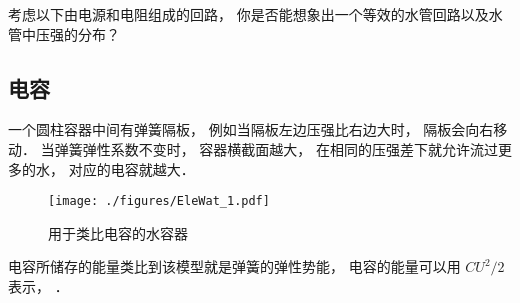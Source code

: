 \begin{exercise}{}
考虑以下由电源和电阻组成的回路， 你是否能想象出一个等效的水管回路以及水管中压强的分布？
\end{exercise}

\subsection{电容}
一个圆柱容器中间有弹簧隔板， 例如当隔板左边压强比右边大时， 隔板会向右移动． 当弹簧弹性系数不变时， 容器横截面越大， 在相同的压强差下就允许流过更多的水， 对应的电容就越大．
\begin{figure}[ht]
\centering
\texttt{[image: ./figures/EleWat\_1.pdf]}
\caption{用于类比电容的水容器} \label{EleWat_fig1}
\end{figure}

电容所储存的能量类比到该模型就是弹簧的弹性势能， 电容的能量可以用 $CU^2/2$ 表示， $$．
